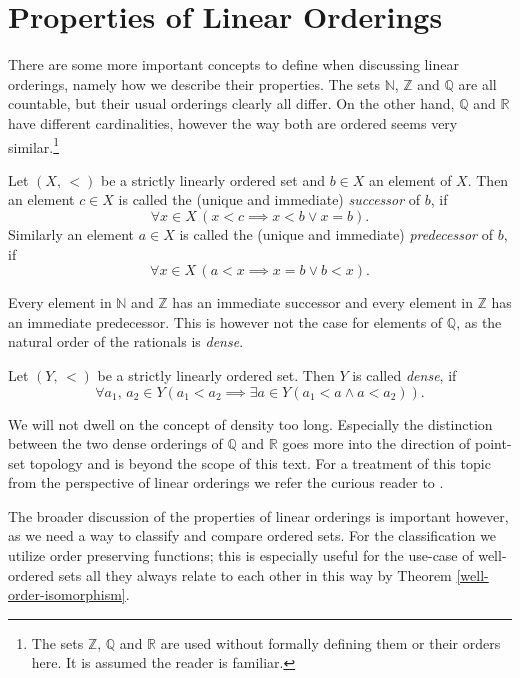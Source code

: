 \documentclass[../../main.tex]{subfiles}
\begin{document}
\section{Properties of Linear Orderings}

There are some more important concepts to define when discussing linear orderings, namely how we describe their properties.
The sets $\mathbb{N}$, $\mathbb{Z}$ and $\mathbb{Q}$ are all countable, but their usual orderings clearly all differ.
On the other hand, $\mathbb{Q}$ and $\mathbb{R}$ have different cardinalities, 
however the way both are ordered seems very similar.\footnote{The sets $\mathbb{Z}$, $\mathbb{Q}$ and $\mathbb{R}$ are used without formally defining them or their orders here.
It is assumed the reader is familiar.}

\begin{definition}\cite[Definition 1.20]{Ros82}
    Let $(X,\, <)$ be a strictly linearly ordered set and $b \in X$ an element of $X$.
    Then an element $c \in X$ is called the (unique and immediate) \textit{successor} of $b$, if
    $$\forall x \in X \, \left(x < c \implies x < b \vee x = b\right).$$
    Similarly an element $a \in X$ is called the (unique and immediate) \textit{predecessor} of $b$, if
    $$\forall x \in X \, \left(a < x \implies x = b \vee b < x\right).$$
\end{definition}
Every element in $\mathbb{N}$ and $\mathbb{Z}$ has an immediate successor and every element in $\mathbb{Z}$ has an immediate predecessor.
This is however not the case for elements of $\mathbb{Q}$, as the natural order of the rationals is \textit{dense}.

\begin{definition}\cite[Definition 2.1]{Ros82}
    Let $(Y,\, <)$ be a strictly linearly ordered set.
    Then $Y$ is called \textit{dense}, if
    $$\forall a_1,\, a_2 \in Y \left(a_1 < a_2 \implies \exists a \in Y \left(a_1 < a \wedge a < a_2\right)\right).$$
\end{definition}

We will not dwell on the concept of density too long.
Especially the distinction between the two dense orderings of $\mathbb{Q}$ and $\mathbb{R}$ goes more into the direction of point-set topology and is beyond the scope of this text.
For a treatment of this topic from the perspective of linear orderings we refer the curious reader to \cite[\S 2]{Ros82}.

The broader discussion of the properties of linear orderings is important however, as we need a way to classify and compare ordered sets.
For the classification we utilize order preserving functions; this is especially useful for the use-case of well-ordered sets all they always relate to each other in this way by Theorem \ref{well-order-isomorphism}.
\end{document}
